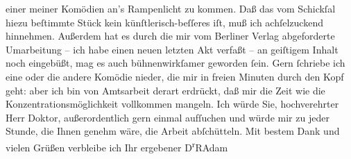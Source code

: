 \begin{ledgroupsized}[t]{13cm}
               einer meiner Komödien an’s Rampenlicht zu kommen. Daß das vom Schickſal hiezu
               beſtimmte Stück kein
               künſtlerisch-beſſeres iſt, muß ich achſelzuckend hinnehmen. Außerdem hat es durch die
               mir vom Berliner Verlag abgeforderte Umarbeitung – ich habe einen neuen
               letzten Akt verfaßt – an geiſtigem Inhalt noch eingebüßt, mag es auch bühnenwirkſamer
               geworden ſein.\pend
           \pstart
           Gern ſchriebe ich eine oder die andere Komödie {\pb}nieder, die mir in freien Minuten durch
               den Kopf geht: aber ich bin von Amtsarbeit derart erdrückt, daß mir die Zeit wie die
               Konzentrationsmöglichkeit vollkommen mangeln.\pend
           \pstart
           Ich würde Sie, hochverehrter Herr Doktor, außerordentlich gern einmal aufſuchen und
               würde mir zu jeder Stunde, die Ihnen genehm wäre, die Arbeit abſchütteln.\pend
           \pstart
           Mit bestem Dank und vielen Grüßen verbleibe ich Ihr ergebener\pend
           \pstart \spacefill\mbox{D\textsuperscript{r}RAdam}\pend{}
         
         \endnumbering{}\end{ledgroupsized}  \newcommand{\dateiname}{L02538}\newcommand{\titel}{Robert Adam an Arthur Schnitzler, 15. 6. 1930}\newcommand{\editorInnen}{Martin Anton Müller und Gerd-Hermann Susen}
      